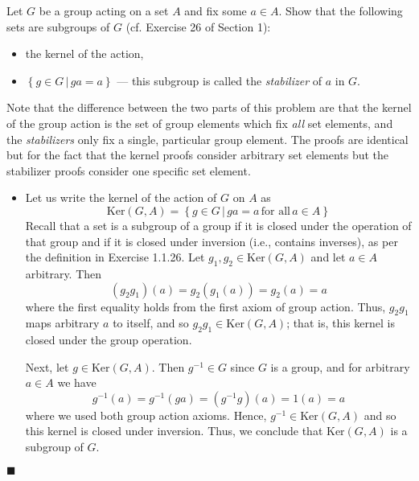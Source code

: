 \documentclass[12pt]{article}
\renewcommand{\qed}{\hfill$\blacksquare$}
\renewenvironment{proof}{\begin{addmargin}[1em]{0em}\begin{newproof}}{\end{newproof}\end{addmargin}\qed}
\newenvironment{problem}[2][Exercise]{\begin{trivlist}
\item[\hskip \labelsep {\bfseries #1}\hskip \labelsep {\bfseries #2.}]}{\end{trivlist}}
\begin{document}
\begin{problem}{1.7.4}
Let $G$ be a group acting on a set $A$ and fix some $a\in A$. Show that the following sets are subgroups of $G$ (cf. Exercise 26 of Section 1):
\begin{itemize}
    \item the kernel of the action,
    \item $\left\{g\in G \, | \, ga=a\right\}$ --- this subgroup is called the \textit{stabilizer} of $a$ in $G$.
\end{itemize}
\end{problem}
\begin{proof}
Note that the difference between the two parts of this problem are that the kernel of the group action is the set of group elements which fix \textit{all} set elements, and the \textit{stabilizers} only fix a single, particular group element. The proofs are identical but for the fact that the kernel proofs consider arbitrary set elements but the stabilizer proofs consider one specific set element.
\begin{itemize}
    \item Let us write the kernel of the action of $G$ on $A$ as
    $$ \text{Ker}\left(G,A\right) = \left\{ g\in G \, | \, ga=a \, \text{for all} \, a\in A\right\} $$ Recall that a set is a subgroup of a group if it is closed under the operation of that group and if it is closed under inversion (i.e., contains inverses), as per the definition in Exercise 1.1.26. Let $g_1, g_2 \in \text{Ker}\left(G,A\right)$ and let $a\in A$ arbitrary. Then
    $$ \left(g_2g_1\right)\left(a\right) = g_2\left(g_1\left(a\right)\right) = g_2\left(a\right) = a $$ where the first equality holds from the first axiom of group action. Thus, $g_2g_1$ maps arbitrary $a$ to itself, and so $g_2g_1\in\text{Ker}\left(G,A\right)$; that is, this kernel is closed under the group operation.

    Next, let $g\in\text{Ker}\left(G,A\right)$. Then $g^{-1}\in G$ since $G$ is a group, and for arbitrary $a\in A$ we have
    $$ g^{-1}\left(a\right) = g^{-1}\left(ga\right) = \left(g^{-1}g\right)\left(a\right) = 1\left(a\right) = a $$ where we used both group action axioms. Hence, $g^{-1}\in \text{Ker}\left(G,A\right)$ and so this kernel is closed under inversion. Thus, we conclude that $\text{Ker}\left(G,A\right)$ is a subgroup of $G$.


\end{itemize}
\end{proof}
\end{document}

